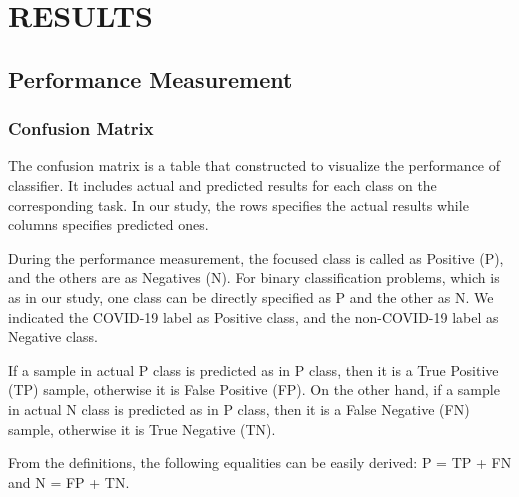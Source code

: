 \chapter{RESULTS}
\label{ch:CH6}

\section{Performance Measurement}

\subsection{Confusion Matrix}

The confusion matrix is a table that constructed to visualize the performance of classifier. It includes actual and predicted results for each class on the corresponding task. In our study, the rows specifies the actual results while columns specifies predicted ones.

During the performance measurement, the focused class is called as Positive (P), and the others are as Negatives (N). For binary classification problems, which is as in our study, one class can be directly specified as P and the other as N. We indicated the COVID-19 label as Positive class, and the non-COVID-19 label as Negative class.

If a sample in actual P class is predicted as in P class, then it is a True Positive (TP) sample, otherwise it is False Positive (FP). On the other hand, if a sample in actual N class is predicted as in P class, then it is a False Negative (FN) sample, otherwise it is True Negative (TN).

From the definitions, the following equalities can be easily derived: P = TP + FN and N = FP + TN.

